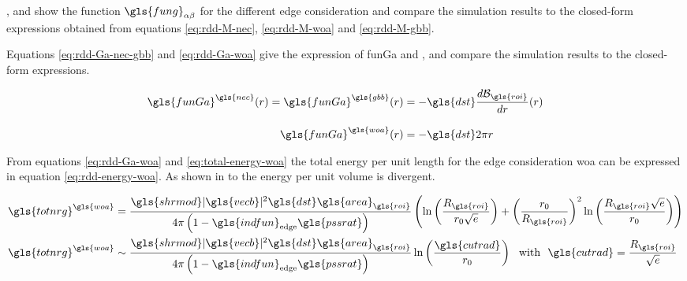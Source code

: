 \bigskip

,  and  show the function \( \gls{fung}_{\alpha \beta} \) for the different edge consideration and compare the simulation results to the closed-form expressions obtained from equations \eqref{eq:rdd-M-nec}, \eqref{eq:rdd-M-woa} and \eqref{eq:rdd-M-gbb}.

%
%
%

\bigskip \bigskip

Equations \eqref{eq:rdd-Ga-nec-gbb} and \eqref{eq:rdd-Ga-woa} give the expression of \gls{funGa} and ,  and  compare the simulation results to the closed-form expressions.

\begin{align}
  \gls{funGa}^{\gls{nec}} (r) =
  \gls{funGa}^{\gls{gbb}} (r) &=
    - \gls{dst} \frac{d \mathcal{B}_{\gls{roi}}}{dr}(r)
    \label{eq:rdd-Ga-nec-gbb}
  \\[3mm]
  \gls{funGa}^{\gls{woa}} (r) &=
    - \gls{dst} 2 \pi r
    \label{eq:rdd-Ga-woa}
\end{align}

%
%
%

\newpage

From equations \eqref{eq:rdd-Ga-woa} and \eqref{eq:total-energy-woa} the total energy per unit length for the edge consideration \gls{woa} can be expressed in equation \eqref{eq:rdd-energy-woa}.
As shown in  to  the energy per unit volume is divergent.

\begin{align}
  \gls{totnrg}^{\gls{woa}} &=
    \frac{\gls{shrmod} | \gls{vecb} |^2 \gls{dst} \gls{area}_{\gls{roi}}}{4 \pi \left(1 - \gls{indfun}_{\mathrm{edge}} \gls{pssrat} \right)} \left( \ln \left( \frac{R_{\gls{roi}}}{r_0 \sqrt{e}} \right) + \left( \frac{r_0}{R_{\gls{roi}}} \right)^2 \ln \left( \frac{R_{\gls{roi}} \sqrt{e}}{r_0} \right) \right)
  \\
  \gls{totnrg}^{\gls{woa}} &\sim
    \frac{\gls{shrmod} | \gls{vecb} |^2 \gls{dst} \gls{area}_{\gls{roi}}}{4 \pi \left(1 - \gls{indfun}_{\mathrm{edge}} \gls{pssrat} \right)} \ln \left( \frac{\gls{cutrad}}{r_0} \right) \ \ \text{with} \ \ \gls{cutrad} = \frac{R_{\gls{roi}}}{\sqrt{e}}
    \label{eq:rdd-energy-woa}
\end{align}

